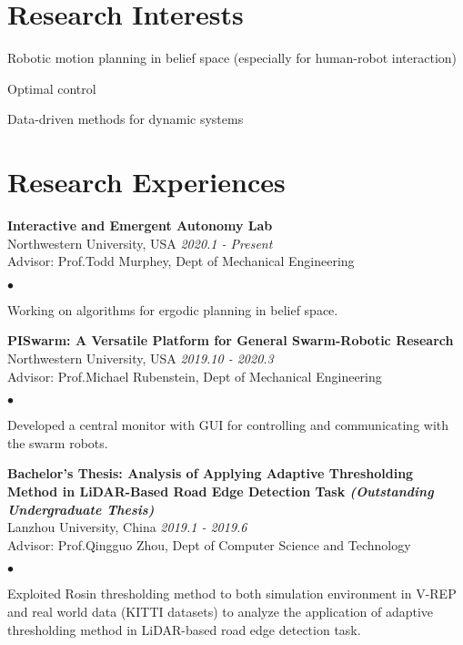 \documentclass[margin,line,pifont,palatino,courier]{res}
\newenvironment{list1}{
	\begin{list}{\ding{113}}{%
			\setlength{\itemsep}{0in}
			\setlength{\parsep}{0in} \setlength{\parskip}{0in}
			\setlength{\topsep}{0in} \setlength{\partopsep}{0in}
			\setlength{\leftmargin}{0.17in}}}{\end{list}}
\newenvironment{list2}{
	\begin{list}{$\bullet$}{%
			\setlength{\itemsep}{0in}
			\setlength{\parsep}{0in} \setlength{\parskip}{0in}
			\setlength{\topsep}{0in} \setlength{\partopsep}{0in}
			\setlength{\leftmargin}{0.2in}}}{\end{list}}
\begin{document}
\begin{resume}
		\section{\sc Research Interests}
		
		\begin{list1}
			\item Robotic motion planning in belief space (especially for human-robot interaction)
			\item Optimal control
			\item Data-driven methods for dynamic systems
		\end{list1}
			
		\section{\sc Research Experiences}
		
		{\bf Interactive and Emergent Autonomy Lab} \\
		Northwestern University, USA \hfill {\sl 2020.1 - Present} \\
		Advisor: Prof.Todd Murphey, Dept of Mechanical Engineering
		\begin{list2}
			\item Working on algorithms for ergodic planning in belief space.
		\end{list2}
		
		{\bf PISwarm: A Versatile Platform for General Swarm-Robotic Research}\\
		Northwestern University, USA \hfill {\sl 2019.10 - 2020.3} \\
		Advisor: Prof.Michael Rubenstein, Dept of Mechanical Engineering
		\begin{list2}
			\item Developed a central monitor with GUI for controlling and communicating with the swarm robots.
		\end{list2}
		
		{\bf Bachelor's Thesis: Analysis of Applying Adaptive Thresholding Method in LiDAR-Based Road Edge Detection Task \it (Outstanding Undergraduate Thesis)}\\
		Lanzhou University, China \hfill {\sl 2019.1 - 2019.6} \\
		Advisor: Prof.Qingguo Zhou, Dept of Computer Science and Technology
		\begin{list2}
			\item Exploited Rosin thresholding method to both simulation environment in V-REP and real world data (KITTI datasets) to analyze the application of adaptive thresholding method in LiDAR-based road edge detection task.
		\end{list2}
		

\end{resume}
\end{document}
